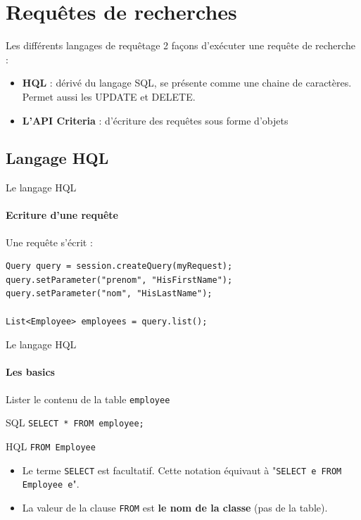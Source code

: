 \documentclass[compress]{beamer}%
\begin{document}

	
\section{Requêtes de recherches}

\begin{frame}{Les différents langages de requêtage}
	2 façons d'exécuter une requête de recherche :
	\begin{itemize}[<+->]
		\item \textbf{HQL} : dérivé du langage SQL, se présente comme une chaine de caractères. Permet aussi les UPDATE et DELETE.
		\item \textbf{L'API Criteria} : d'écriture des requêtes sous forme d'objets
	\end{itemize}

\end{frame}


\subsection{Langage HQL}

\begin{frame}[fragile]{Le langage HQL}
	\framesubtitle{Ecriture d'une requête}
	
	Une requête s'écrit : 
	\begin{lstlisting}
Query query = session.createQuery(myRequest);
query.setParameter("prenom", "HisFirstName");
query.setParameter("nom", "HisLastName");

List<Employee> employees = query.list();
	\end{lstlisting}

\end{frame}

\begin{frame}[fragile]{Le langage HQL}
	\framesubtitle{Les basics}
	
	\begin{block}{}
		\center
		Lister le contenu de la table \texttt{employee}
	\end{block}
	
	\begin{exampleblock}{SQL}
		\texttt{SELECT * FROM employee;}
	\end{exampleblock}

	\pause
	\begin{exampleblock}{HQL}
		\texttt{FROM Employee}
	\end{exampleblock}
	
	\pause
	\begin{itemize}
		\item Le terme \texttt{SELECT} est facultatif. Cette notation équivaut à "\texttt{SELECT e FROM Employee e}".
		\item La valeur de la clause \texttt{FROM} est \textbf{le nom de la classe} (pas de la table).
	\end{itemize}

\end{frame}
\end{document}
